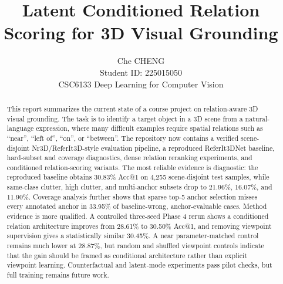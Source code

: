 \documentclass{article}
\title{Latent Conditioned Relation Scoring for 3D Visual Grounding}
\author{%
  Che CHENG\\
  Student ID: 225015050\\
  CSC6133 Deep Learning for Computer Vision\\
}
\makeatletter
\newcommand{\acc}{Acc@1}
\makeatother
\begin{document}
\maketitle

\begin{abstract}
This report summarizes the current state of a course project on relation-aware 3D visual grounding. The task is to identify a target object in a 3D scene from a natural-language expression, where many difficult examples require spatial relations such as ``near'', ``left of'', ``on'', or ``between''. The repository now contains a verified scene-disjoint Nr3D/ReferIt3D-style evaluation pipeline, a reproduced ReferIt3DNet baseline, hard-subset and coverage diagnostics, dense relation reranking experiments, and conditioned relation-scoring variants. The most reliable evidence is diagnostic: the reproduced baseline obtains 30.83\% \acc{} on 4,255 scene-disjoint test samples, while same-class clutter, high clutter, and multi-anchor subsets drop to 21.96\%, 16.07\%, and 11.90\%. Coverage analysis further shows that sparse top-5 anchor selection misses every annotated anchor in 33.95\% of baseline-wrong, anchor-evaluable cases. Method evidence is more qualified. A controlled three-seed Phase 4 rerun shows a conditioned relation architecture improves from 28.61\% to 30.50\% \acc{}, and removing viewpoint supervision gives a statistically similar 30.45\%. A near parameter-matched control remains much lower at 28.87\%, but random and shuffled viewpoint controls indicate that the gain should be framed as conditional architecture rather than explicit viewpoint learning. Counterfactual and latent-mode experiments pass pilot checks, but full training remains future work.
\end{abstract}









\FloatBarrier
\begingroup
\small
\setlength{\bibsep}{0pt plus 0.3ex}


\endgroup
\end{document}
